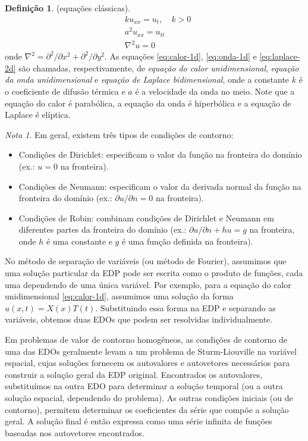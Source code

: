 \documentclass{article}
\theoremstyle{plain}
\theoremstyle{definition}
\newtheorem{defn}{Definição}[section]
\theoremstyle{remark}
\newtheorem*{rem}{Nota}
\begin{document}
\begin{defn} (equações clássicas).
    \begin{align}
        &k u_{xx} = u_t, \quad k>0 \label{eq:calor-1d} \\
        &a^2 u_{xx} = u_{tt} \label{eq:onda-1d} \\
        &\nabla^2 u = 0 \label{eq:laplace-2d}
    \end{align}
    \noindent onde \(\nabla^2 = \partial^2/\partial x^2 + \partial^2/\partial y^2\).
    As equações \eqref{eq:calor-1d}, \eqref{eq:onda-1d} e \eqref{eq:laplace-2d} são chamadas, respectivamente, de \emph{equação do calor unidimensional}, \emph{equação da onda unidimensional} e \emph{equação de Laplace bidimensional}, onde a constante \(k\) é o coeficiente de difusão térmica e \(a\) é a velocidade da onda no meio.
    Note que a equação do calor é parabólica, a equação da onda é hiperbólica e a equação de Laplace é elíptica.
\end{defn}

\begin{rem}
    Em geral, existem três tipos de condições de contorno:
    \begin{itemize}
        \item[(i)] Condições de Dirichlet: especificam o valor da função na fronteira do domínio (ex.: \(u=0\) na fronteira).
        \item[(ii)] Condições de Neumann: especificam o valor da derivada normal da função na fronteira do domínio (ex.: \(\partial u/\partial n=0\) na fronteira).
        \item[(iii)] Condições de Robin: combinam condições de Dirichlet e Neumann em diferentes partes da fronteira do domínio (ex.: \(\partial u/\partial n + hu = g\) na fronteira, onde \(h\) é uma constante e \(g\) é uma função definida na fronteira).
    \end{itemize}
\end{rem}

No método de separação de variáveis (ou método de Fourier), assumimos que uma solução particular da EDP pode ser escrita como o produto de funções, cada uma dependendo de uma única variável. Por exemplo, para a equação do calor unidimensional \eqref{eq:calor-1d}, assumimos uma solução da forma \(u(x,t) = X(x)T(t)\). Substituindo essa forma na EDP e separando as variáveis, obtemos duas EDOs que podem ser resolvidas individualmente.

Em problemas de valor de contorno homogêneos, as condições de contorno de uma das EDOs geralmente levam a um problema de Sturm-Liouville na variável espacial, cujas soluções fornecem os autovalores e autovetores necessários para construir a solução geral da EDP original. Encontrados os autovalores, substituímos na outra EDO para determinar a solução temporal (ou a outra solução espacial, dependendo do problema). As outras condições iniciais (ou de contorno), permitem determinar os coeficientes da série que compõe a solução geral. A solução final é então expressa como uma série infinita de funções baseadas nos autovetores encontrados.
\end{document}
